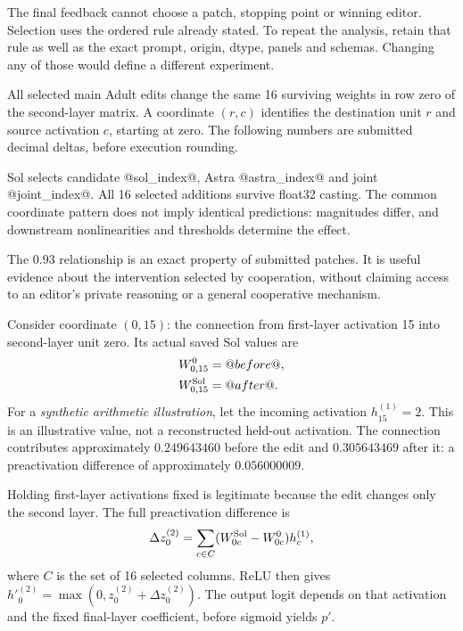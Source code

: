 The final feedback cannot choose a patch, stopping point or winning editor. Selection uses the ordered rule already stated. To repeat the analysis, retain that rule as well as the exact prompt, origin, dtype, panels and schemas. Changing any of those would define a different experiment.

All selected main Adult edits change the same 16 surviving weights in row zero of the second-layer matrix. A coordinate $(r,c)$ identifies the destination unit $r$ and source activation $c$, starting at zero. The following numbers are submitted decimal deltas, before execution rounding.


Sol selects candidate @sol_index@, Astra @astra_index@ and joint @joint_index@. All 16 selected additions survive float32 casting. The common coordinate pattern does not imply identical predictions: magnitudes differ, and downstream nonlinearities and thresholds determine the effect.

The 0.93 relationship is an exact property of submitted patches. It is useful evidence about the intervention selected by cooperation, without claiming access to an editor's private reasoning or a general cooperative mechanism.

Consider coordinate $(0,15)$: the connection from first-layer activation 15 into second-layer unit zero. Its actual saved Sol values are
\[
\begin{aligned}
W^0_{0,15}&=@before@,\\
W^{\rm Sol}_{0,15}&=@after@.
\end{aligned}
\]
For a \emph{synthetic arithmetic illustration}, let the incoming activation $h^{(1)}_{15}=2$. This is an illustrative value, not a reconstructed held-out activation. The connection contributes approximately $0.249643460$ before the edit and $0.305643469$ after it: a preactivation difference of approximately $0.056000009$.

Holding first-layer activations fixed is legitimate because the edit changes only the second layer. The full preactivation difference is
\[
\Delta z^{(2)}_0=\sum_{c\in C}(W^{\rm Sol}_{0c}-W^0_{0c})h^{(1)}_c,
\]
where $C$ is the set of 16 selected columns. ReLU then gives $h'^{(2)}_0=\max(0,z^{(2)}_0+\Delta z^{(2)}_0)$. The output logit depends on that activation and the fixed final-layer coefficient, before sigmoid yields $p'$.

